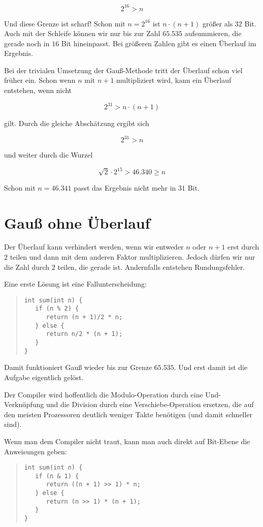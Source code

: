 \documentclass[a5paper,landscape,ngerman,10pt]{article}
\begin{document}
\[2^{16} > n\]

Und diese Grenze ist scharf! Schon mit $n=2^{16}$ ist
$n\cdot(n+1)$ größer als $32$ Bit.
Auch mit der Schleife können wir nur bis zur Zahl $65.535$
aufsummieren, die gerade noch in $16$ Bit hineinpasst.
Bei größeren Zahlen gibt es einen Überlauf im Ergebnis.

Bei der trivialen Umsetzung der Gauß-Methode tritt der
Überlauf schon viel früher ein.
Schon wenn $n$ mit $n+1$ multipliziert wird, kann ein
Überlauf entstehen, wenn nicht

\[2^{31}>n\cdot(n+1)\]

gilt.
Durch die gleiche Abschätzung ergibt sich

\[2^{31}>n\]

und weiter durch die Wurzel

\[\sqrt{2}\cdot2^{15}>46.340\geq n\]

Schon mit $n=46.341$ passt das Ergebnis nicht mehr in $31$ Bit.

\section{Gauß ohne Überlauf}

Der Überlauf kann verhindert werden, wenn wir entweder $n$ oder
$n+1$ erst durch $2$ teilen und dann mit dem anderen Faktor
multiplizieren.
Jedoch dürfen wir nur die Zahl durch $2$ teilen, die gerade
ist.
Andernfalls entstehen Rundungsfehler.

Eine erste Lösung ist eine Fallunterscheidung:

\begin{quotation}
\begin{lstlisting}
int sum(int n) {
   if (n % 2) {
      return (n + 1)/2 * n;
   } else {
      return n/2 * (n + 1);
   }
}
\end{lstlisting}
\end{quotation}

Damit funktioniert Gauß wieder bis zur Grenze $65.535$.
Und erst damit ist die Aufgabe eigentlich gelöst.

Der Compiler wird hoffentlich die Modulo-Operation durch eine
Und-Verknüpfung und die Division durch eine
Verschiebe-Operation ersetzen, die auf den meisten
Prozessoren deutlich weniger Takte benötigen (und damit
schneller sind).

Wenn man dem Compiler nicht traut, kann man auch direkt
auf Bit-Ebene die Anweisungen geben:

\begin{quotation}
\begin{lstlisting}
int sum(int n) {
   if (n & 1) {
      return ((n + 1) >> 1) * n;
   } else {
      return (n >> 1) * (n + 1);
   }
}
\end{lstlisting}
\end{quotation}
\end{document}

